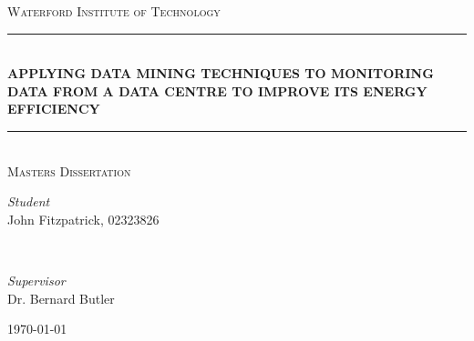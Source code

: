 \documentclass[12pt]{scrartcl}
\begin{document}
\begin{titlepage}
	\newcommand{\HRule}{\rule{\linewidth}{0.5mm}}

	\center
	\textsc{\LARGE Waterford Institute of Technology}\\[1.5cm]
	\HRule\\[0.4cm]

	\huge\bfseries \MakeTextUppercase{Applying Data Mining Techniques to Monitoring Data from a Data Centre to Improve its Energy Efficiency}\\[0.4cm]

	\HRule\\[1.0cm]
	\textsc{\large Masters Dissertation}\\[1.5cm]
	\begin{minipage}{0.4\textwidth}
		\begin{flushleft}
			\large
			\textit{Student}\\
			John Fitzpatrick, 02323826
		\end{flushleft}
	\end{minipage}
	~
	\begin{minipage}{0.4\textwidth}
		\begin{flushright}
			\large
			\textit{Supervisor}\\
      Dr. Bernard Butler
		\end{flushright}
	\end{minipage}


	\vfill\vfill\vfill

	{\large\today}

	\vfill

\end{titlepage}
\end{document}
